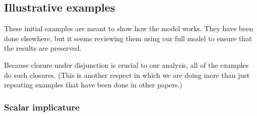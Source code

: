 \documentclass{article}
\begin{document}
\subsection{Illustrative examples}\label{sec:illustrations}

\begin{examples}
\item These initial examples are meant to show how the model works.
  They have been done elsewhere, but it seems reviewing them using our
  full model to ensure that the results are preserved.

\item Because closure under disjunction is crucial to our analysis,
  all of the examples do such closures. (This is another respect in
  which we are doing more than just repeating examples that have been
  done in other papers.)
\end{examples}

\newpage

\subsubsection{Scalar implicature}\label{sec:scalar}

\newcommand{\scalarstate}[1]{w_{#1}}
\newcommand{\wALL}{\scalarstate{\forall}}
\newcommand{\wSOMENOTALL}{\scalarstate{\exists\neg\forall}}

\newcommand{\scalarmsg}[1]{\word{#1}}
\newcommand{\mAll}{\scalarmsg{all}}
\newcommand{\mSome}{\scalarmsg{some}}
\newcommand{\mSomevAll}{\scalarmsg{some or all}}
\end{document}
